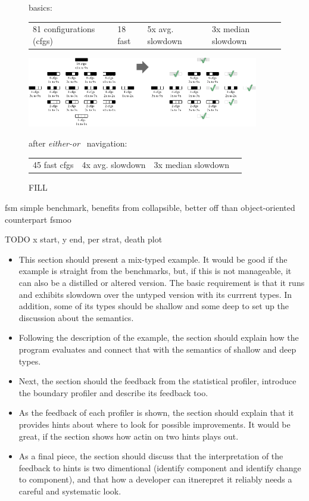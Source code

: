 \begin{figure}[t]

     basics:
    \begin{tabular}{llll}
      81 configurations (cfgs) &
      18 fast &
      5x avg. slowdown &
      3x median slowdown
    \end{tabular}

    \bigskip

    \includegraphics[width=0.9\textwidth]{data/fsm-lattice.pdf}

    after \emph{either-or}~\cite{g-deep-shallow} navigation:
    \begin{tabular}{llll}
      45 fast cfgs &
      4x avg. slowdown &
      3x median slowdown
    \end{tabular}

  \caption{FILL}
  \label{f:fsm-seascape}
\end{figure}

fsm simple benchmark,
benefits from collapsible, better off than object-oriented counterpart fsmoo



TODO x start, y end, per strat, death plot

\begin{itemize}
  \item This section should present a mix-typed example. It would be good
    if the example is straight from the benchmarks, but, if this is not
    manageable, it can also be a distilled or altered version.  The basic
    requirement is that it runs and exhibits slowdown over the untyped
    version with its currrent types. In addition, some of its types should
    be shallow and some deep to set up the discussion about the
    semantics.
  \item Following the description of the example,  
    the section should explain how the program evaluates and connect that with the
    semantics of shallow and deep types. 
  \item Next, the section should the feedback from the statistical
    profiler, introduce the boundary profiler  and 
    describe its feedback too. 
  \item As the feedback of each profiler is shown, the section should 
    explain that it provides hints about where to look for
    possible improvements. It would be great, if the section shows how
    actin on two hints plays out.  
  \item As a final piece, the section should discuss that the
    interpretation
    of the feedback to hints is two dimentional (identify component and
    identify change to component), and that how a developer can itnerepret
    it reliably needs a careful and systematic look.
\end{itemize}


